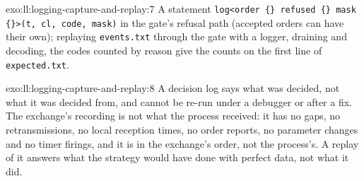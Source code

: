 \begin{solution}{exo:ll:logging-capture-and-replay:7}
A statement \texttt{log<\textquotedbl{}order \{\} refused \{\} mask \{\}\textquotedbl{}>(t, cl, code, mask)} in the gate's
refusal path (accepted orders can have their own); replaying \texttt{events.txt} through the gate with a logger, draining and
decoding, the codes counted by reason give the counts on the first line of \texttt{expected.txt}.
\end{solution}

\begin{solution}{exo:ll:logging-capture-and-replay:8}
A decision log says what was decided, not what it was decided from, and cannot be re-run under a debugger or after a fix. The
exchange's recording is not what the process received: it has no gaps, no retransmissions, no local reception times, no
order reports, no parameter changes and no timer firings, and it is in the exchange's order, not the process's. A replay of it
answers what the strategy would have done with perfect data, not what it did.
\end{solution}

